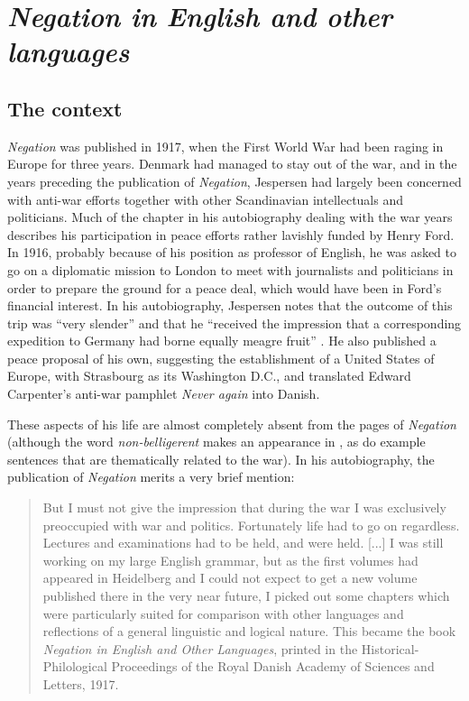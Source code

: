 \documentclass[output=chapter]{langscibook}
\begin{document}
\section{\textit{Negation in English and other languages}}

\subsection{The context}

\textit{Negation} was published in 1917, when the First World War had been raging in Europe for three years. Denmark had managed to stay out of the war, and in the years preceding the publication of \textit{Negation}, Jespersen had largely been concerned with anti-war efforts together with other Scandinavian intellectuals and politicians. Much of the chapter in his autobiography dealing with the war years describes his participation in peace efforts rather lavishly funded by Henry Ford. In 1916, probably because of his position as professor of English, he was asked to go on a diplomatic mission to London to meet with journalists and politicians in order to prepare the ground for a peace deal, which would have been in Ford’s financial interest. %
In his autobiography, Jespersen notes that the outcome of this trip was ``very slender'' and that he ``received the impression that a corresponding expedition to Germany had borne equally meagre fruit'' \citep[196]{Jespersen1995}. He also published a peace proposal of his own, suggesting the establishment of a United States of Europe, with Strasbourg as its Washington D.C., and translated Edward Carpenter’s anti-war pamphlet \textit{Never again} into Danish.

These aspects of his life are almost completely absent from the pages of \textit{Negation} (although the word \textit{non-belligerent} makes an appearance in , as do example sentences that are thematically related to the war). In his autobiography, the publication of \textit{Negation} merits a very brief mention:

\begin{quote}
But I must not give the impression that during the war I was exclusively preoccupied with war and politics. Fortunately life had to go on regardless. Lectures and examinations had to be held, and were held. [...] I was still working on my large English grammar, but as the first volumes had appeared in Heidelberg and I could not expect to get a new volume published there in the very near future, I picked out some chapters which were particularly suited for comparison with other languages and reflections of a general linguistic and logical nature. This became the book \textit{Negation in English and Other Languages}, printed in the Historical-Philological Proceedings of the Royal Danish Academy of Sciences and Letters, 1917.\\\phantom{.}\hfill\citep[196--197]{Jespersen1995}
\end{quote}
\end{document}
